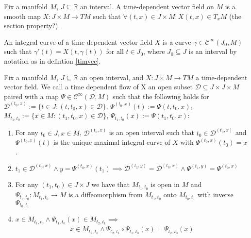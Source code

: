 \begin{definition} \label{timvec}
Fix a manifold $M$, $J \subseteq \mathbb{R}$ an interval. A time-dependent vector field on $M$ is a smooth map $X: J \times M \to TM$ such that $\forall (t,x) \in J \times M: X(t,x) \in T_x M$ (the section property?).
\end{definition}

\begin{definition}
An integral curve of a time-dependent vector field $X$ is a curve $\gamma \in \mathcal{C}^\infty(J_0,M)$ such that $\gamma '(t) = X(t,\gamma(t))$ for all $t \in J_0$, where $J_0 \subseteq J$ is an interval by notation as in defintion \ref{timvec}.
\end{definition}

\begin{definition}
Fix a manifold $M$, $J \subseteq \mathbb{R}$ an open interval, and $X : J\times M \to TM$ a time-dependent vector field. We call a time dependent flow of X an open subset $\mathcal{D} \subseteq J \times J \times M$ paired with a map $\Psi \in \mathcal{C}^\infty(\mathcal{D},M)$ such that the following holds for $\mathcal{D}^{(t_0,x)} := \{t\in J: (t,t_0,x) \in \mathcal{D} \}$, $\Psi^{(t_0,x)}(t) := \Psi(t,t_0,x)$, $M_{t_1,t_0} := \{ x \in M:(t_1,t_0,x) \in \mathcal{D} \}$, $\Psi_{t_1,t_0}(x):= \Psi(t_1,t_0,x)$:
\begin{enumerate}
\item For any $t_0 \in J, x \in M$, $\mathcal{D}^{(t_0,x)}$ is an open interval such that $t_0 \in \mathcal{D}^{(t_0,x)}$ and $\Psi^{(t_0,x)}(t)$ is the unique maximal integral curve of $X$ with $\Psi^{(t_0,x)}(t_0) = x$.
\item $t_1 \in \mathcal{D}^{(t_0,x)} \land y = \Psi^{(t_0,x)}(t_1) \implies \mathcal{D}^{(t_1,y)} = \mathcal{D}^{(t_0,x)} \land \Psi^{(t_1,y)} = \Psi^{(t_0,x)}$
\item For any $(t_1,t_0) \in J \times J$ we have that $M_{t_1,t_0}$ is open in $M$ and $\Psi_{t_1,t_0}: M_{t_1,t_0} \to M$ is a diffeomorphism from $M_{t_1,t_0}$ onto $M_{t_0,t_1}$ with inverse $\Psi_{t_0,t_1}$
\item $x \in M_{t_1,t_0} \land \Psi_{t_1,t_0}(x) \in M_{t_2,t_1} \implies$
\begin{align*}
x \in M_{t_2,t_0} \land \Psi_{t_2,t_1} \circ \Psi_{t_1,t_0}(x) = \Psi_{t_2, t_0}(x)
\end{align*}
\end{enumerate}
\end{definition}

